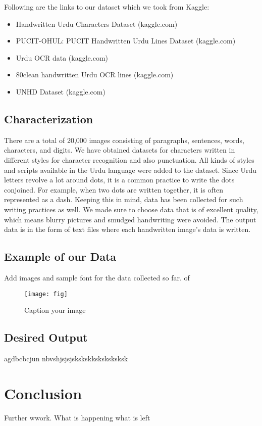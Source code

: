 \documentclass[11pt,twocolumn,twoside]{article} %
\begin{document}
Following are the links to our dataset which we took from Kaggle:

\begin{itemize}
    \item Handwritten Urdu Characters Dataset (kaggle.com)
    \item PUCIT-OHUL: PUCIT Handwritten Urdu Lines Dataset (kaggle.com)
    \item Urdu OCR data (kaggle.com)
    \item 80clean handwritten Urdu OCR lines (kaggle.com)
    \item UNHD Dataset (kaggle.com)
\end{itemize}

\subsection{Characterization}
There are a total of 20,000 images consisting of paragraphs, sentences, words, characters, and digits. We have obtained datasets for characters written in different styles for character recognition and also punctuation. All kinds of styles and scripts available in the Urdu language were added to the dataset. Since Urdu letters revolve a lot around dots, it is a common practice to write the dots conjoined. For example, when two dots are written together, it is often represented as a dash. Keeping this in mind, data has been collected for such writing practices as well. We made sure to choose data that is of excellent quality, which means blurry pictures and smudged handwriting were avoided. The output data is in the form of text files where each handwritten image’s data is written.


\subsection{Example of our Data}
Add images and sample font for the data collected so far.
of 
\begin{figure}[H]  
\centering  
\texttt{[image: fig]} 
\caption{Caption your image} 
\label{lvdt4}
\end{figure}


\subsection{Desired Output}
agdbcbcjun nbvshjsjsjskskskksksksksksk




\section{Conclusion}

Further wwork. What is happening what is left

\newpage
\renewcommand{\refname}{References}


\end{document}

